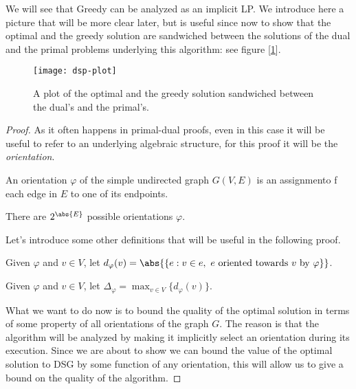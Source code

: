 \begin{obs}
    We will see that Greedy can be analyzed as an implicit LP. We introduce here a picture that will be more clear later, but is useful since now to show that the optimal and the greedy solution are sandwiched between the solutions of the dual and the primal problems underlying this algorithm: see figure [\ref{fig:dsp-plot}].
    \begin{figure}[h!]
        \centering
        \texttt{[image: dsp-plot]}
        \caption{A plot of the optimal and the greedy solution sandwiched between the dual's and the primal's.}
        \label{fig:dsp-plot}
    \end{figure}
\end{obs}

\begin{proof}
    As it often happens in primal-dual proofs, even in this case it will be useful to refer to an underlying algebraic structure, for this proof it will be the \textit{orientation}.
    
    \begin{defn}[Orientation]
        An orientation $\varphi$ of the simple undirected graph $G(V,E)$ is an assignmento f each edge in $E$ to one of its endpoints.
    \end{defn}
    
    \obs There are $2^{\abs{E}}$ possible orientations $\varphi$.
    
    Let's introduce some other definitions that will be useful in the following proof.
    
    \begin{defn}
        Given $\varphi$ and $v \in V$, let $d_\varphi(v) = \abs{\{ e : v \in e,\ e \text{ oriented towards } v \text{ by } \varphi \}}$.
    \end{defn}
    
    \begin{defn}
        Given $\varphi$ and $v \in V$, let $\Delta_\varphi = \max_{v \in V}\{d_\varphi(v)\}$.
    \end{defn}

    \pagebreak
    
    What we want to do now is to bound the quality of the optimal solution in terms of some property of all orientations of the graph $G$. The reason is that the algorithm will be analyzed by making it implicitly select an orientation during its execution. Since we are about to show we can bound the value of the optimal solution to DSG by some function of any orientation, this will allow us to give a bound on the quality of the algorithm.
    

\end{proof}
